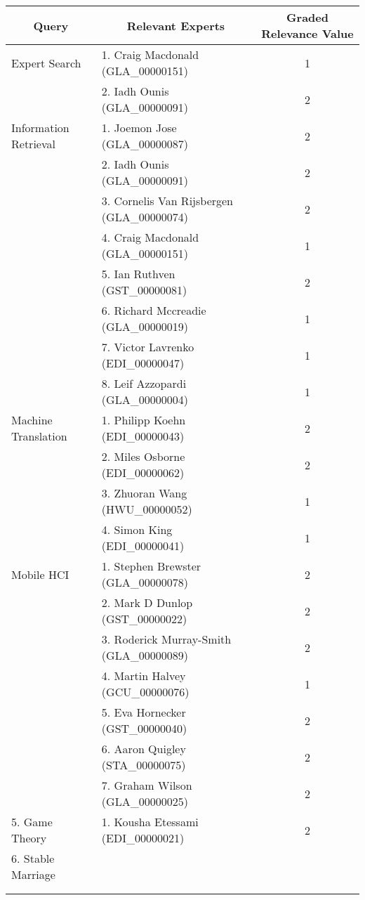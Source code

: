 \footnotesize
\begin{longtable}{|l|l|c|}

\hline \multicolumn{1}{|c|}{\textbf{Query}} & \multicolumn{1}{|c|}{\textbf{Relevant Experts}} & \multicolumn{1}{|c|}{\textbf{Graded Relevance Value}} \\

\hline Expert Search & 1. Craig Macdonald (GLA_00000151)  & 1 \\
\hline  & 2. Iadh Ounis (GLA_00000091) & 2 \\
\hline Information Retrieval & 1. Joemon Jose (GLA_00000087) & 2 \\
\hline  & 2. Iadh Ounis (GLA_00000091)  & 2 \\
\hline  & 3. Cornelis Van Rijsbergen (GLA_00000074)  & 2 \\
\hline  & 4. Craig Macdonald (GLA_00000151) & 1 \\
\hline  & 5. Ian Ruthven (GST_00000081)  & 2 \\
\hline  & 6. Richard Mccreadie (GLA_00000019) & 1 \\
\hline  & 7. Victor Lavrenko (EDI_00000047) & 1 \\
\hline  & 8. Leif  Azzopardi (GLA_00000004) & 1 \\
\hline Machine Translation & 1. Philipp Koehn (EDI_00000043) & 2 \\
\hline  & 2. Miles Osborne (EDI_00000062) & 2 \\
\hline  & 3. Zhuoran Wang (HWU_00000052) & 1 \\
\hline  & 4. Simon King (EDI_00000041) & 1 \\
\hline Mobile HCI & 1. Stephen Brewster (GLA_00000078) & 2 \\
\hline  & 2. Mark D Dunlop (GST_00000022) & 2 \\
\hline  & 3. Roderick Murray-Smith (GLA_00000089) & 2 \\
\hline  & 4. Martin Halvey (GCU_00000076) & 1 \\
\hline  & 5. Eva Hornecker (GST_00000040) & 2 \\
\hline  & 6. Aaron Quigley (STA_00000075) & 2 \\
\hline  & 7. Graham Wilson (GLA_00000025) & 2 \\
\hline 5. Game Theory & 1. Kousha Etessami (EDI_00000021) & 2 \\
\hline 6. Stable Marriage &  &  \\
\hline  &  &  \\
\hline  &  &  \\

\end{longtable}
